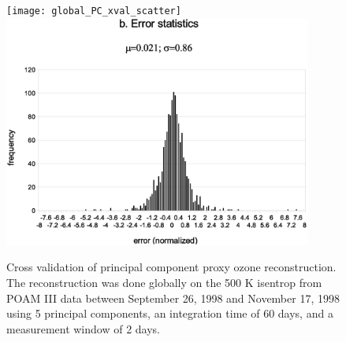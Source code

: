 \documentclass{article}
\begin{document}
\begin{figure}
  \centering
  \texttt{[image: global\_PC\_xval\_scatter]}
  \includegraphics[width=0.9\textwidth]{global_PC_xval_error}
  \caption{Cross validation of principal component proxy ozone reconstruction. The reconstruction was done globally on the 500 K isentrop from POAM III data between September 26, 1998 and November 17, 1998 using 5 principal components,  an integration time of 60 days, and a measurement window of 2 days.}
  \label{PC_cross_validation}
\end{figure}
\end{document}

